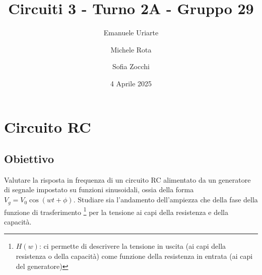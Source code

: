 \documentclass[a4paper]{article}
\title{Circuiti 3 - Turno 2A - Gruppo 29}
\author{Emanuele Uriarte \and Michele Rota \and Sofia Zocchi}
\date{4 Aprile 2025}
\begin{document}
\maketitle

\section{Circuito RC} 
\subsection{Obiettivo}
Valutare la risposta in frequenza di un circuito RC alimentato da un generatore di segnale impostato su funzioni sinusoidali, ossia della forma 
$V_g = V_{0}  \cos(wt +\phi)$. Studiare sia l'andamento dell'ampiezza che della fase della funzione di trasferimento \footnote{$H(w)$: ci permette di descrivere la tensione in uscita (ai capi della resistenza o della capacità) come funzione della resistenza in entrata (ai capi del generatore)} per la tensione ai capi della resistenza e della capacità. 
\end{document}
